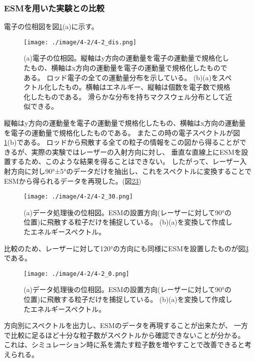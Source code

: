 \documentclass[a4paper,11pt,titlepage]{jsarticle}
\begin{document}
    \subsubsection{ESMを用いた実験との比較}
    電子の位相図を図\ref{fig:4-2_dis}(a)に示す。
    \begin{figure}[H]
      \begin{center}
        \texttt{[image: ./image/4-2/4-2\_dis.png]}
        \caption{
          \label{fig:4-2_dis}
            (a)電子の位相図。縦軸はy方向の運動量を電子の運動量で規格化したもの、横軸はx方向の運動量を電子の運動量で規格化したものである。
            ロッド電子の全ての運動量分布を示している。
            (b)(a)をスペクトル化したもの。横軸はエネルギー、縦軸は個数を電子数で規格化したものである。
            滑らかな分布を持ちマクスウェル分布として近似できる。
        }
      \end{center}
    \end{figure} 
    縦軸はy方向の運動量を電子の運動量で規格化したもの、横軸はx方向の運動量を電子の運動量で規格化したものである。
    またこの時の電子スペクトルが図\ref{fig:4-2_dis}(b)である。
    ロッドから飛散する全ての粒子の情報をこの図から得ることができるが、実際の実験ではレーザーの入射方向に対し、
    垂直な直線上にESMを設置するため、このような結果を得ることはできない。
    したがって、レーザー入射方向に対し90°±5°のデータだけを抽出し、これをスペクトルに変換することで
    ESMから得られるデータを再現した。(図\ref{fig:4-2_30}\ref{fig:4-2_0})
    \begin{figure}[H]
      \begin{center}
        \texttt{[image: ./image/4-2/4-2\_30.png]}
        \caption{
          \label{fig:4-2_30}
            (a)データ処理後の位相図。ESMの設置方向(レーザーに対して90°の位置)に飛散する粒子だけを捕捉している。
            (b)(a)を変換して作成したエネルギースペクトル。
        }
      \end{center}
    \end{figure} 
    比較のため、レーザーに対して120°の方向にも同様にESMを設置したものが図\ref{fig:4-2_0}である。
    \begin{figure}[H]
      \begin{center}
        \texttt{[image: ./image/4-2/4-2\_0.png]}
        \caption{
          \label{fig:4-2_0}
            (a)データ処理後の位相図。ESMの設置方向(レーザーに対して90°の位置)に飛散する粒子だけを捕捉している。
            (b)(a)を変換して作成したエネルギースペクトル。
        }
      \end{center}
    \end{figure} 
    方向別にスペクトルを出力し、ESMのデータを再現することが出来たが、
    一方で比較に足るほど十分な粒子数がスペクトルから確認できないことが分かる。
    これは、シミュレーション時に系を満たす粒子数を増やすことで改善できると考えられる。
\end{document}
